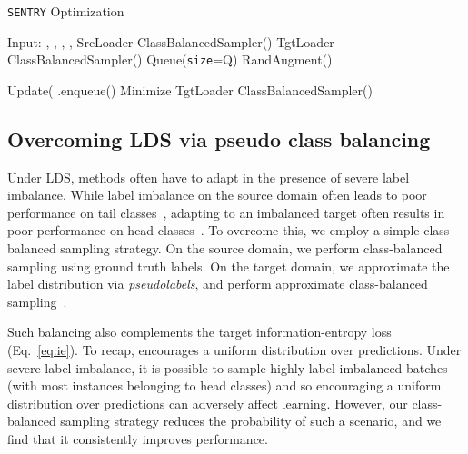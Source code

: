 \documentclass[10pt,twocolumn,letterpaper]{article}
\newcommand{\method}{\texttt{SENTRY}\xspace}
\begin{document}
\begin{algorithm}
\caption{\method Optimization}
\label{algo:sentry}
\begin{algorithmic}[1]
\State Input: , , , , 
\ForAll{} \Comment{\textcolor{blue}{Init target pseudo-labels}}
    \State     
\EndFor
\State SrcLoader  ClassBalancedSampler()
\State TgtLoader  ClassBalancedSampler()
\State  Queue(\texttt{size}=Q)
        \State \Comment{\textcolor{blue}{Clean prediction}}
        \State  RandAugment()
        \State {\small }
        \State {\small  }
        
         \Comment{\textcolor{blue}{Consistent}}
            \State 

        \Else \Comment{\textcolor{blue}{Inconsistent}}
            \State 
        \EndIf
        \State Update(
        \State .enqueue() \Comment{\textcolor{blue}{Update pseudo-label queue}}
    \EndFor
    \State Minimize 
    \State TgtLoader  ClassBalancedSampler()
\EndFor
\end{algorithmic}
\end{algorithm}
\vspace*{-1.1cm}
\subsection{Overcoming LDS via pseudo class balancing} 
\label{sec:pcb}

Under LDS, methods often have to adapt in the presence of severe label imbalance. While label imbalance on the source domain often leads to poor performance on tail classes~\cite{cui2019class,wang2017learning}, adapting to an imbalanced target often results in poor performance on head classes~\cite{li2020rethinking,wu2019domain}. To overcome this, we employ a simple class-balanced sampling strategy. On the source domain, we perform class-balanced sampling using ground truth labels. On the target domain, we approximate the label distribution via \emph{pseudolabels}, and perform approximate class-balanced sampling~\cite{zou2018unsupervised}. 

Such balancing also complements the target information-entropy loss ~\cite{li2020rethinking} (Eq.~\ref{eq:ie}). To recap,  encourages a uniform distribution over predictions. Under severe label imbalance, it is possible to sample highly label-imbalanced batches (with most instances belonging to head classes) and so encouraging a uniform distribution over predictions can adversely affect learning. However, our class-balanced sampling strategy reduces the probability of such a scenario, and we find that it consistently improves performance.
\end{document}

